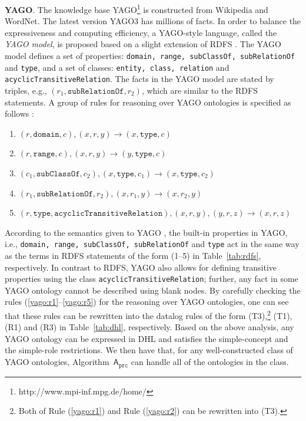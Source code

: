 \textbf{YAGO}. The knowledge base YAGO\footnote{http://www.mpi-inf.mpg.de/home/}
is constructed from Wikipedia and WordNet. The latest version
YAGO3 \cite{MahdisoltaniBS15} has millions of facts.
In order to balance the expressiveness and computing efficiency,
a YAGO-style language, called the \emph{YAGO model}, is proposed based on
a slight extension of RDFS \cite{SuchanekKW08}. The YAGO model defines
a set of properties: \texttt{domain, range, subClassOf, subRelationOf} and \texttt{type},
and a set of classes: \texttt{entity, class, relation} and \texttt{acyclicTransitiveRelation}.
The facts in the YAGO model are stated by triples, e.g., $(r_1,
\texttt{subRelationOf}, r_2)$,
which are similar to the RDFS statements.
A group of rules for reasoning over YAGO ontologies
is specified as follows \cite{SuchanekKW08}:
\begin{enumerate}[leftmargin=8ex,label=(\arabic*),ref=\arabic*]
  \item $(r,\texttt{domain}, c), (x, r, y) \rightarrow (x,
    \texttt{type}, c)$\label{yago:r1}
  \item $(r,\texttt{range}, c), (x, r, y) \rightarrow (y,
    \texttt{type}, c)$\label{yago:r2}
  \item $(c_1, \texttt{subClassOf}, c_2), (x, \texttt{type}, c_1)
    \rightarrow (x, \texttt{type}, c_2)$\label{yago:r3}
  \item $(r_1, \texttt{subRelationOf}, r_2), (x, r_1, y) \rightarrow
    (x, r_2, y)$\label{yago:r4}
  \item $(r, \texttt{type}, \texttt{acyclicTransitiveRelation}), (x,
    r, y), (y, r, z) \rightarrow (x, r, z)$\label{yago:r5}
\end{enumerate}
According to the semantics given to YAGO \cite{SuchanekKW08}, the built-in properties in YAGO,
i.e., \texttt{domain, range, subClassOf, subRelationOf} and \texttt{type} act in the same
way as the terms in RDFS statements of the form (1--5) in Table~\ref{tab:rdfs}, respectively.
In contrast to RDFS, YAGO also allows for defining
transitive properties using the
class \texttt{acyclicTransitiveRelation}; further, any fact in some YAGO ontology cannot be
described using blank nodes. By carefully checking the rules (\ref{yago:r1}--\ref{yago:r5}) for the reasoning over YAGO ontologies,
one can see that these rules can be rewritten into the datalog rules
of the form (T3),\footnote{Both of Rule (\ref{yago:r1}) and
Rule (\ref{yago:r2}) can be rewritten into (T3).} (T1), (R1) and (R3) in Table~\ref{tab:dhl}, respectively.
Based on the above analysis, any YAGO ontology can be expressed in DHL
and satisfies the simple-concept and the simple-role restrictions. We then have that,
for any well-constructed class of YAGO ontologies,
Algorithm~$\mathsf{A}_{\texttt{prc}}$
can handle all of the ontologies in the class.

